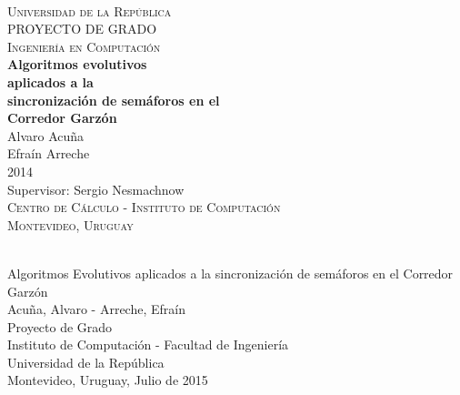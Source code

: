 \begin{titlepage}
  \thispagestyle{empty}
  \begin{center}
    ~\\[2.2cm]



    \textsc{\Huge Universidad de la República } \\[2.5cm]
    \textsc{\Huge PROYECTO DE GRADO } \\[0.5cm]
    \textsc{\Huge Ingeniería en Computación } \\[2.5cm]    
    \textbf{\Huge Algoritmos evolutivos} \\[0.2cm]
    \textbf{\Huge aplicados a la } \\[0.2cm]    
    \textbf{\Huge sincronización de semáforos en el } \\[0.3cm]
    \textbf{\Huge Corredor Garzón } \\[1.5cm]    
    
    {\huge Alvaro Acuña} \\[0.2cm]
    {\huge Efraín Arreche} \\[0.2cm]
    {\Large 2014} \\[2.0cm]
    {\Large Supervisor: Sergio Nesmachnow} \\[1.0cm]

    \textsc{\large Centro de Cálculo - Instituto de Computación} \\[0.2cm]
    \textsc{\large Montevideo, Uruguay} \\[1.5cm]

  \end{center}
  \vfill
\end{titlepage}
{
  \thispagestyle{empty}
  ~\\[16cm]
  Algoritmos Evolutivos aplicados a la sincronización de semáforos en el Corredor Garzón \\[0.05cm]
  Acuña, Alvaro - Arreche, Efraín \\[0.05cm]
  Proyecto de Grado \\[0.05cm]
  Instituto de Computación - Facultad de Ingeniería \\[0.05cm]
  Universidad de la República \\[0.05cm]
  Montevideo, Uruguay, Julio de 2015 \\[0.05cm]
  \vfill
  \cleardoublepage
}
\setcounter{page}{1}